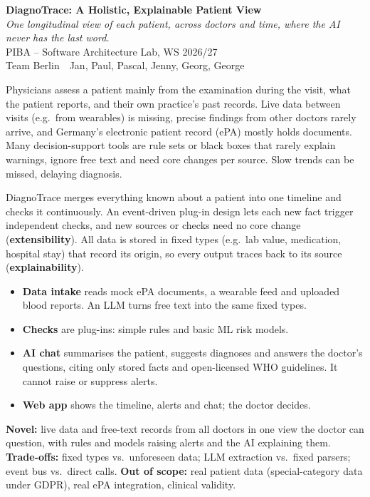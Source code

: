 \documentclass[11pt,a4paper]{article}
\newcommand{\pibapart}[1]{\vspace{0.4em}{\large\textbf{#1}}\par}
\newcommand{\projecttitle}{DiagnoTrace: A Holistic, Explainable Patient View}
\newcommand{\teamname}{Team Berlin}
\newcommand{\teammembers}{Jan, Paul, Pascal, Jenny, Georg, George}
\begin{document}
\begin{center}
  {\LARGE\textbf{\projecttitle}}\\[0.3em]
  \emph{One longitudinal view of each patient, across doctors and time, where the
  AI never has the last word.}\\[0.3em]
  {\large PIBA -- Software Architecture Lab, WS 2026/27}\\[0.3em]
  \teamname\ \textbullet\ \teammembers
\end{center}

\pibapart{Problem}
Physicians assess a patient mainly from the examination during the visit, what the
patient reports, and their own practice's past records. Live data between visits
(e.g.\ from wearables) is missing, precise findings from other doctors rarely
arrive, and Germany's electronic patient record (ePA) mostly holds documents. Many
decision-support tools are rule sets or black boxes that rarely explain warnings,
ignore free text and need core changes per source. Slow trends can be missed,
delaying diagnosis.

\pibapart{Idea}
DiagnoTrace merges everything known about a patient into one timeline and checks it
continuously. An event-driven plug-in design lets each new fact trigger independent
checks, and new sources or checks need no core change (\textbf{extensibility}). All
data is stored in fixed types (e.g.\ lab value, medication, hospital stay) that
record its origin, so every output traces back to its source (\textbf{explainability}).
\begin{itemize}
  \item \textbf{Data intake} reads mock ePA documents, a wearable feed and uploaded
  blood reports. An LLM turns free text into the same fixed types.
  \item \textbf{Checks} are plug-ins: simple rules and basic ML risk models.
  \item \textbf{AI chat} summarises the patient, suggests diagnoses and answers the
  doctor's questions, citing only stored facts and open-licensed WHO guidelines. It
  cannot raise or suppress alerts.
  \item \textbf{Web app} shows the timeline, alerts and chat; the doctor decides.
\end{itemize}
\textbf{Novel:} live data and free-text records from all doctors in one view the
doctor can question, with rules and models raising alerts and the AI explaining them.
\textbf{Trade-offs:} fixed types vs.\ unforeseen data; LLM extraction vs.\ fixed
parsers; event bus vs.\ direct calls. \textbf{Out of scope:} real patient data
(special-category data under GDPR), real ePA integration, clinical validity.
\end{document}

